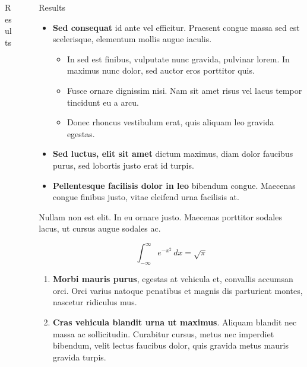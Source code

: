 \documentclass[final]{beamer}
\newlength{\sepwidth}
\newlength{\colwidth}
\newcommand{\separatorcolumn}{\begin{column}{\sepwidth}\end{column}}
\begin{document}
\begin{frame}[t]
\begin{columns}[t]
\begin{column}{\colwidth}
\begin{block}{Results}
			\end{block}
			
		\end{column}
	
		\separatorcolumn
		
		\begin{column}{\colwidth}
			
			\begin{block}{Results}
				
				\begin{itemize}
					\item \textbf{Sed consequat} id ante vel efficitur. Praesent congue massa
					sed est scelerisque, elementum mollis augue iaculis.
					\begin{itemize}
						\item In sed est finibus, vulputate
						nunc gravida, pulvinar lorem. In maximus nunc dolor, sed auctor eros
						porttitor quis.
						\item Fusce ornare dignissim nisi. Nam sit amet risus vel lacus
						tempor tincidunt eu a arcu.
						\item Donec rhoncus vestibulum erat, quis aliquam leo
						gravida egestas.
					\end{itemize}
					\item \textbf{Sed luctus, elit sit amet} dictum maximus, diam dolor
					faucibus purus, sed lobortis justo erat id turpis.
					\item \textbf{Pellentesque facilisis dolor in leo} bibendum congue.
					Maecenas congue finibus justo, vitae eleifend urna facilisis at.
				\end{itemize}

				
				Nullam non est elit. In eu ornare justo. Maecenas porttitor sodales lacus,
				ut cursus augue sodales ac.
				
				$$
				\int_{-\infty}^{\infty} e^{-x^2}\,dx = \sqrt{\pi}
				$$
				
				\begin{enumerate}
					\item \textbf{Morbi mauris purus}, egestas at vehicula et, convallis
					accumsan orci. Orci varius natoque penatibus et magnis dis parturient
					montes, nascetur ridiculus mus.
					\item \textbf{Cras vehicula blandit urna ut maximus}. Aliquam blandit nec
					massa ac sollicitudin. Curabitur cursus, metus nec imperdiet bibendum,
					velit lectus faucibus dolor, quis gravida metus mauris gravida turpis.
				\end{enumerate}
				

\end{block}
\end{column}
\end{columns}
\end{frame}
\end{document}
